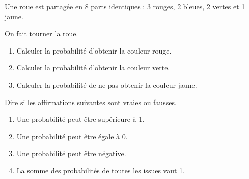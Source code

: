 \documentclass[11pt]{article}
\begin{document}
\begin{exercice}

Une roue est partagée en 8 parts identiques :
3 rouges, 2 bleues, 2 vertes et 1 jaune.

On fait tourner la roue.

\begin{enumerate}
    \item Calculer la probabilité d'obtenir la couleur rouge.
    \item Calculer la probabilité d'obtenir la couleur verte.
    \item Calculer la probabilité de ne pas obtenir la couleur jaune.
\end{enumerate}

\end{exercice}


\begin{exercice}

Dire si les affirmations suivantes sont vraies ou fausses.

\begin{enumerate}
    \item Une probabilité peut être supérieure à 1.
    \item Une probabilité peut être égale à 0.
    \item Une probabilité peut être négative.
    \item La somme des probabilités de toutes les issues vaut 1.
\end{enumerate}

\end{exercice}
\end{document}
